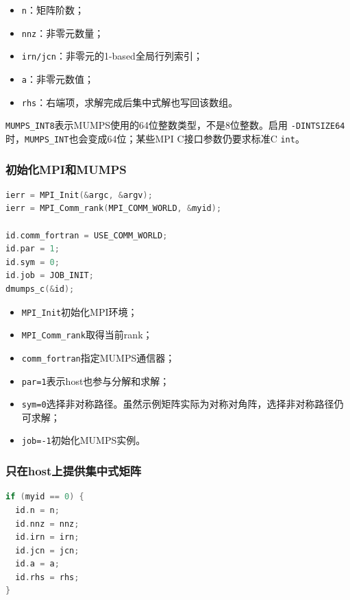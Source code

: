 \begin{itemize}
  \item \texttt{n}：矩阵阶数；
  \item \texttt{nnz}：非零元数量；
  \item \texttt{irn/jcn}：非零元的1-based全局行列索引；
  \item \texttt{a}：非零元数值；
  \item \texttt{rhs}：右端项，求解完成后集中式解也写回该数组。
\end{itemize}

\texttt{MUMPS\_INT8}表示MUMPS使用的64位整数类型，不是8位整数。启用 \texttt{-DINTSIZE64}时，\texttt{MUMPS\_INT}也会变成64位；某些MPI C接口参数仍要求标准C \texttt{int}。

\subsubsection{初始化MPI和MUMPS}

\begin{lstlisting}[language=C]
ierr = MPI_Init(&argc, &argv);
ierr = MPI_Comm_rank(MPI_COMM_WORLD, &myid);

id.comm_fortran = USE_COMM_WORLD;
id.par = 1;
id.sym = 0;
id.job = JOB_INIT;
dmumps_c(&id);
\end{lstlisting}

\begin{itemize}
  \item \texttt{MPI\_Init}初始化MPI环境；
  \item \texttt{MPI\_Comm\_rank}取得当前rank；
  \item \texttt{comm\_fortran}指定MUMPS通信器；
  \item \texttt{par=1}表示host也参与分解和求解；
  \item \texttt{sym=0}选择非对称路径。虽然示例矩阵实际为对称对角阵，选择非对称路径仍可求解；
  \item \texttt{job=-1}初始化MUMPS实例。
\end{itemize}

\subsubsection{只在host上提供集中式矩阵}

\begin{lstlisting}[language=C]
if (myid == 0) {
  id.n = n;
  id.nnz = nnz;
  id.irn = irn;
  id.jcn = jcn;
  id.a = a;
  id.rhs = rhs;
}
\end{lstlisting}

